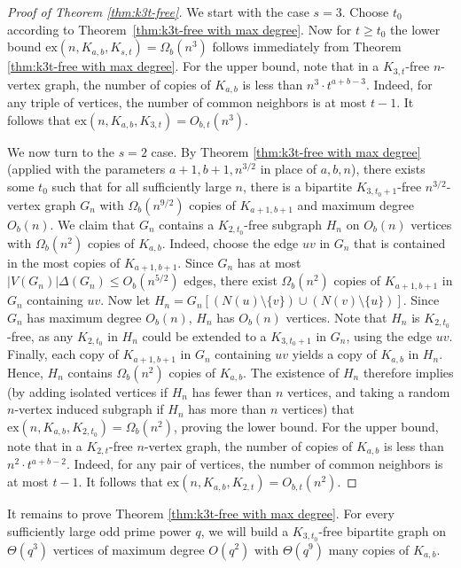 \documentclass[12pt]{article}
\newcommand{\ex}{\mathrm{ex}}
\begin{document}
\begin{proof}[Proof of Theorem \ref{thm:k3t-free}]
    We start with the case $s=3$. Choose $t_0$ according to Theorem~\ref{thm:k3t-free with max degree}. Now for $t\geq t_0$ the lower bound $\ex(n,K_{a,b},K_{s,t})=\Omega_b(n^3)$ follows immediately from Theorem \ref{thm:k3t-free with max degree}. For the upper bound, note that in a $K_{3, t}$-free $n$-vertex graph, the number of copies of $K_{a, b}$ is less than $n^3 \cdot t^{a + b - 3} $. Indeed, for any triple of vertices, the number of common neighbors is at most $t-1$. It follows that $\ex(n,K_{a,b},K_{3,t})=O_{b,t}(n^3)$.

    We now turn to the $s=2$ case. By Theorem \ref{thm:k3t-free with max degree} (applied with the parameters $a+1,b+1,n^{3/2}$ in place of $a,b,n$), there exists some $t_0$ such that for all sufficiently large $n$, there is a bipartite $K_{3,t_0+1}$-free $n^{3/2}$-vertex graph $G_n$ with $\Omega_b(n^{9/2})$ copies of $K_{a+1,b+1}$ and maximum degree $O_b(n)$. We claim that $G_n$ contains a $K_{2,t_0}$-free subgraph $H_n$ on $O_b(n)$ vertices with $\Omega_b(n^2)$ copies of $K_{a,b}$. Indeed, choose the edge $uv$ in $G_n$ that is contained in the most copies of $K_{a+1,b+1}$. Since $G_n$ has at most $|V(G_n)|\Delta(G_n)\leq O_b(n^{5/2})$ edges, there exist $\Omega_b(n^2)$ copies of $K_{a+1,b+1}$ in $G_n$ containing $uv$. Now let $H_n=G_n[(N(u)\setminus \{v\})\cup (N(v)\setminus \{u\})]$. Since $G_n$ has maximum degree $O_b(n)$, $H_n$ has $O_b(n)$ vertices. Note that $H_n$ is $K_{2,t_0}$-free, as any $K_{2,t_0}$ in $H_n$ could be extended to a $K_{3,t_0+1}$ in $G_n$, using the edge $uv$. Finally, each copy of $K_{a+1,b+1}$ in $G_n$ containing $uv$ yields a copy of $K_{a,b}$ in $H_n$. Hence, $H_n$ contains $\Omega_b(n^2)$ copies of $K_{a,b}$. The existence of $H_n$ therefore implies (by adding isolated vertices if $H_n$ has fewer than $n$ vertices, and taking a random $n$-vertex induced subgraph if $H_n$ has more than $n$ vertices) that $\ex(n,K_{a,b},K_{2,t_0})=\Omega_b(n^2)$, proving the lower bound. For the upper bound, note that in a $K_{2, t}$-free $n$-vertex graph, the number of copies of $K_{a, b}$ is less than $n^2 \cdot t^{a + b - 2} $. Indeed, for any pair of vertices, the number of common neighbors is at most $t-1$. It follows that $\ex(n,K_{a,b},K_{2,t})=O_{b,t}(n^2)$.
\end{proof}

It remains to prove Theorem \ref{thm:k3t-free with max degree}.
For every sufficiently large odd prime power $q$, we will build a $K_{3,t_0}$-free bipartite graph on $\Theta(q^3)$ vertices of maximum degree $O(q^2)$ with $\Theta(q^9)$ many copies of $K_{a,b}$.
\end{document}
